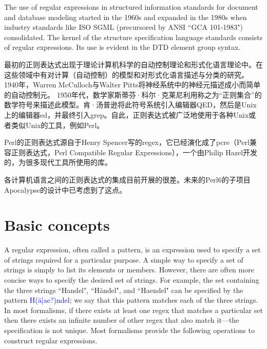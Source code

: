 The use of regular expressions in structured information standards for document and database modeling started in the 1960s and expanded in the 1980s when industry standards like ISO SGML (precursored by ANSI ``GCA 101-1983") consolidated. The kernel of the structure specification language standards consists of regular expressions. Its use is evident in the DTD element group syntax.

最初的正则表达式出现于理论计算机科学的自动控制理论和形式化语言理论中。在这些领域中有对计算（自动控制）的模型和对形式化语言描述与分类的研究。 1940年，Warren McCulloch与Walter Pitts将神经系统中的神经元描述成小而简单的自动控制元。 1950年代，数学家斯蒂芬·科尔·克莱尼利用称之为“正则集合”的数学符号来描述此模型。肯·汤普逊将此符号系统引入编辑器QED，然后是Unix上的编辑器ed，并最终引入grep。自此，正则表达式被广泛地使用于各种Unix或者类似Unix的工具，例如Perl。

Perl的正则表达式源自于Henry Spencer写的regex，它已经演化成了pcre（Perl兼容正则表达式，Perl Compatible Regular Expressions），一个由Philip Hazel开发的，为很多现代工具所使用的库。

各计算机语言之间的正则表达式的集成目前开展的很差。未来的Perl6的子项目Apocalypse的设计中已考虑到了这点。




\chapter{Basic concepts}


A regular expression, often called a \textsf{pattern}, is an expression used to specify a set of strings required for a particular purpose. A simple way to specify a set of strings is simply to list its elements or members. However, there are often more concise ways to specify the desired set of strings. For example, the set containing the three strings ``Handel", ``Händel", and ``Haendel" can be specified by the \textsf{pattern} \textcolor{Blue}{\textsf{H(ä|ae?)ndel;}} we say that this pattern \textsf{matches} each of the three strings. In most formalisms, if there exists at least one regex that matches a particular set then there exists an infinite number of other regex that also match it—the specification is not unique. Most formalisms provide the following operations to construct regular expressions.

